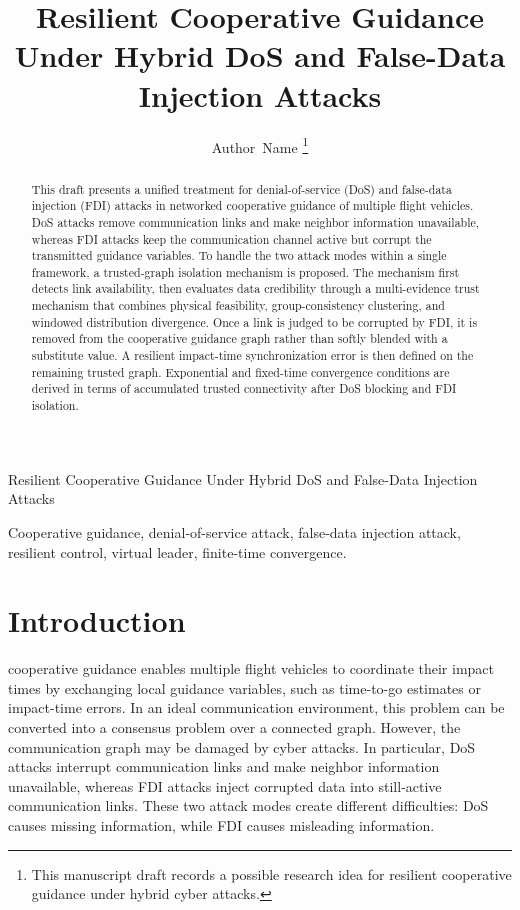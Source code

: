 \documentclass[lettersize,journal]{IEEEtran}
\begin{document}
\title{Resilient Cooperative Guidance Under Hybrid DoS and False-Data Injection Attacks}

\author{Author~Name
\thanks{This manuscript draft records a possible research idea for resilient cooperative guidance under hybrid cyber attacks.}}

%
{Resilient Cooperative Guidance Under Hybrid DoS and False-Data Injection Attacks}

\maketitle

\begin{abstract}
This draft presents a unified treatment for denial-of-service (DoS) and false-data injection (FDI) attacks in networked cooperative guidance of multiple flight vehicles. DoS attacks remove communication links and make neighbor information unavailable, whereas FDI attacks keep the communication channel active but corrupt the transmitted guidance variables. To handle the two attack modes within a single framework, a trusted-graph isolation mechanism is proposed. The mechanism first detects link availability, then evaluates data credibility through a multi-evidence trust mechanism that combines physical feasibility, group-consistency clustering, and windowed distribution divergence. Once a link is judged to be corrupted by FDI, it is removed from the cooperative guidance graph rather than softly blended with a substitute value. A resilient impact-time synchronization error is then defined on the remaining trusted graph. Exponential and fixed-time convergence conditions are derived in terms of accumulated trusted connectivity after DoS blocking and FDI isolation.
\end{abstract}

\begin{IEEEkeywords}
Cooperative guidance, denial-of-service attack, false-data injection attack, resilient control, virtual leader, finite-time convergence.
\end{IEEEkeywords}

\section{Introduction}
 cooperative guidance enables multiple flight vehicles to coordinate their impact times by exchanging local guidance variables, such as time-to-go estimates or impact-time errors. In an ideal communication environment, this problem can be converted into a consensus problem over a connected graph. However, the communication graph may be damaged by cyber attacks. In particular, DoS attacks interrupt communication links and make neighbor information unavailable, whereas FDI attacks inject corrupted data into still-active communication links. These two attack modes create different difficulties: DoS causes missing information, while FDI causes misleading information.
\end{document}
